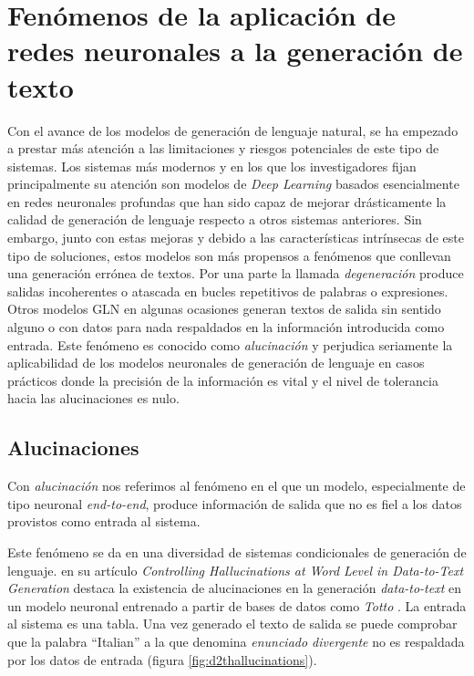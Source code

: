 \section{Fenómenos de la aplicación de redes neuronales a la generación de texto}
\label{sec:efectos_alu_deg}

Con el avance de los modelos de generación de lenguaje natural, se ha empezado a prestar más atención a las limitaciones y riesgos potenciales de este tipo de sistemas. Los sistemas más modernos y en los que los investigadores fijan principalmente su atención son modelos de \textit{Deep Learning} basados esencialmente en redes neuronales profundas que han sido capaz de mejorar drásticamente la calidad de generación de lenguaje respecto a otros sistemas anteriores. Sin embargo, junto con estas mejoras y debido a las características intrínsecas de este tipo de soluciones, estos modelos son más propensos a fenómenos que conllevan una generación errónea de textos. Por una parte la llamada \textit{degeneración} produce salidas incoherentes o atascada en bucles repetitivos de palabras o expresiones. Otros modelos GLN en algunas ocasiones generan textos de salida sin sentido alguno o con datos para nada respaldados en la información introducida como entrada. Este fenómeno es conocido como \textit{alucinación} y perjudica seriamente la aplicabilidad de los modelos neuronales de generación de lenguaje en casos prácticos donde la precisión de la información es vital y el nivel de tolerancia hacia las alucinaciones es nulo.

\subsection{Alucinaciones}
\label{sec:alucinaciones}

Con \textit{alucinación} nos referimos al fenómeno en el que un modelo, especialmente de tipo neuronal \textit{end-to-end}, produce información de salida que no es fiel a los datos provistos como entrada al sistema. 

Este fenómeno se da en una diversidad de sistemas condicionales de generación de lenguaje. \cite{hallucinations_data2text} en su artículo \textit{Controlling Hallucinations at Word Level in Data-to-Text Generation} destaca la existencia de alucinaciones en la generación \textit{data-to-text} en un modelo neuronal entrenado a partir de bases de datos como \textit{Totto} \citep{parikh-etal-2020-totto}. La entrada al sistema es una tabla. Una vez generado el texto de salida se puede comprobar que la palabra ``Italian'' a la que denomina \textit{enunciado divergente} no es respaldada por los datos de entrada (figura \ref{fig:d2thallucinations}).

